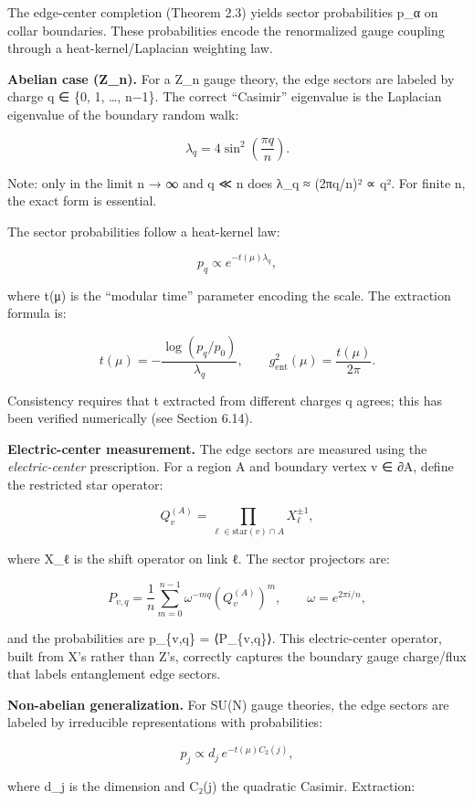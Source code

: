 \documentclass[
]{article}
\begin{document}
The edge-center completion (Theorem 2.3) yields sector probabilities
p\_α on collar boundaries. These probabilities encode the renormalized
gauge coupling through a heat-kernel/Laplacian weighting law.

\textbf{Abelian case (Z\_n).} For a Z\_n gauge theory, the edge sectors
are labeled by charge q ∈ \{0, 1, \ldots, n−1\}. The correct ``Casimir''
eigenvalue is the Laplacian eigenvalue of the boundary random walk:

\[
\lambda_q = 4 \sin^2\left(\frac{\pi q}{n}\right).
\]

Note: only in the limit n → ∞ and q ≪ n does λ\_q ≈ (2πq/n)² ∝ q². For
finite n, the exact form is essential.

The sector probabilities follow a heat-kernel law:

\[
p_q \propto e^{-t(\mu) \lambda_q},
\]

where t(μ) is the ``modular time'' parameter encoding the scale. The
extraction formula is:

\[
t(\mu) = -\frac{\log(p_q/p_0)}{\lambda_q}, \qquad
g_{\mathrm{ent}}^2(\mu) = \frac{t(\mu)}{2\pi}.
\]

Consistency requires that t extracted from different charges q agrees;
this has been verified numerically (see Section 6.14).

\textbf{Electric-center measurement.} The edge sectors are measured
using the \emph{electric-center} prescription. For a region A and
boundary vertex v ∈ ∂A, define the restricted star operator:

\[
Q_v^{(A)} = \prod_{\ell \in \mathrm{star}(v) \cap A} X_\ell^{\pm 1},
\]

where X\_ℓ is the shift operator on link ℓ. The sector projectors are:

\[
P_{v,q} = \frac{1}{n} \sum_{m=0}^{n-1} \omega^{-mq} \left(Q_v^{(A)}\right)^m,
\qquad \omega = e^{2\pi i/n},
\]

and the probabilities are p\_\{v,q\} = ⟨P\_\{v,q\}⟩. This
electric-center operator, built from X's rather than Z's, correctly
captures the boundary gauge charge/flux that labels entanglement edge
sectors.

\textbf{Non-abelian generalization.} For SU(N) gauge theories, the edge
sectors are labeled by irreducible representations with probabilities:

\[
p_j \propto d_j \, e^{-t(\mu) C_2(j)},
\]

where d\_j is the dimension and C₂(j) the quadratic Casimir. Extraction:
\end{document}
